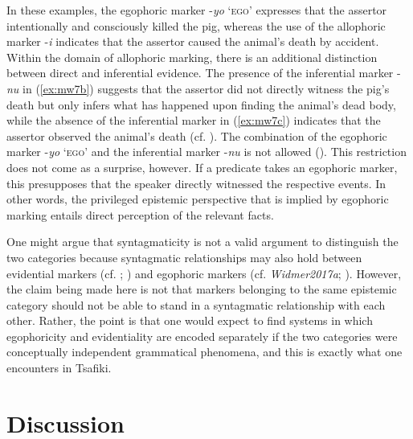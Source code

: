 \documentclass[output=paper]{langsci/langscibook}
\begin{document}
In these examples, the egophoric marker -\textit{yo} ‘\textsc{ego}’ expresses that the assertor intentionally and consciously killed the pig, whereas the use of the allophoric marker -\textit{i} indicates that the assertor caused the animal’s death by accident. Within the domain of allophoric marking, there is an additional distinction between direct and inferential evidence. The presence of the inferential marker -\textit{nu} in (\ref{ex:mw7b}) suggests that the assertor did not directly witness the pig’s death but only infers what has happened upon finding the animal’s dead body, while the absence of the inferential marker in (\ref{ex:mw7c}) indicates that the assertor observed the animal’s death (cf. \citealt[412]{Dickinson2000}). The combination of the egophoric marker -\textit{yo} ‘\textsc{ego}’ and the inferential marker -\textit{nu} is not allowed (\citealt[410--413]{Dickinson2000}). This restriction does not come as a surprise, however. If a predicate takes an egophoric marker, this presupposes that the speaker directly witnessed the respective events. In other words, the privileged epistemic perspective that is implied by egophoric marking entails direct perception of the relevant facts.

One might argue that syntagmaticity is not a valid argument to distinguish the two categories because syntagmatic relationships may also hold between evidential markers (cf. \citealt{Aikhenvald2004}; \citealt{Hengeveld2015}) and egophoric markers (cf. \textit{Widmer2017a}; \citealt{Floyd2018}). However, the claim being made here is not that markers belonging to the same epistemic category should not be able to stand in a syntagmatic relationship with each other. Rather, the point is that one would expect to find systems in which egophoricity and evidentiality are encoded separately if the two categories were conceptually independent grammatical phenomena, and this is exactly what one encounters in Tsafiki.

\section{Discussion}\label{s:mw5}
\end{document}
